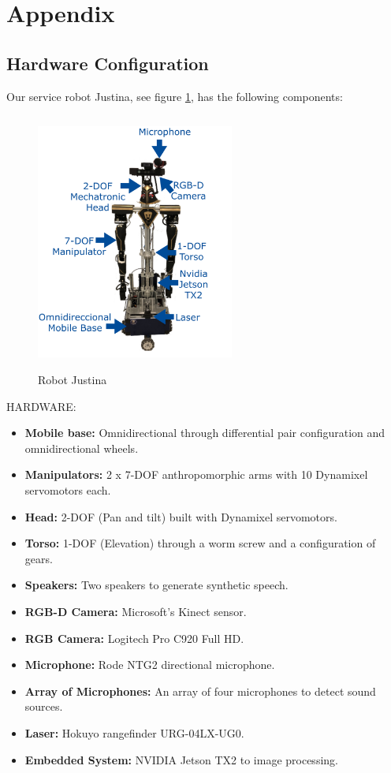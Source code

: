 \documentclass{llncs}
\begin{document}
\appendix
\section{Appendix}\label{sec:appendix}
\subsection{Hardware Configuration}

Our service robot Justina, see figure \ref{fig:justina}, has the following components:\\

\begin{figure}
	\includegraphics[angle=0, height=8.5cm, width=6.5cm]{Figures/justina_diagrama.png}
  \caption{Robot Justina}
  \label{fig:justina}
\end{figure}



HARDWARE:

\begin{itemize}
	\item \textbf{Mobile base:} Omnidirectional through differential pair configuration and omnidirectional wheels. 
	\item \textbf{Manipulators:} 2 x 7-DOF anthropomorphic arms with 10 Dynamixel servomotors each.
	\item \textbf{Head:} 2-DOF (Pan and tilt) built with Dynamixel servomotors.
	\item \textbf{Torso:} 1-DOF (Elevation) through a worm screw and a configuration of gears. 
	\item \textbf{Speakers:} Two speakers to generate synthetic speech.
	\item \textbf{RGB-D Camera:} Microsoft's Kinect sensor. 
	\item \textbf{RGB Camera:} Logitech Pro C920 Full HD.
	\item \textbf{Microphone:} Rode NTG2 directional microphone.
	\item \textbf{Array of Microphones:} An array of four microphones to detect sound sources.
	\item \textbf{Laser:} Hokuyo rangefinder URG-04LX-UG0.
	\item \textbf{Embedded System:} NVIDIA Jetson TX2 to image processing.
\end{itemize}
\end{document}
